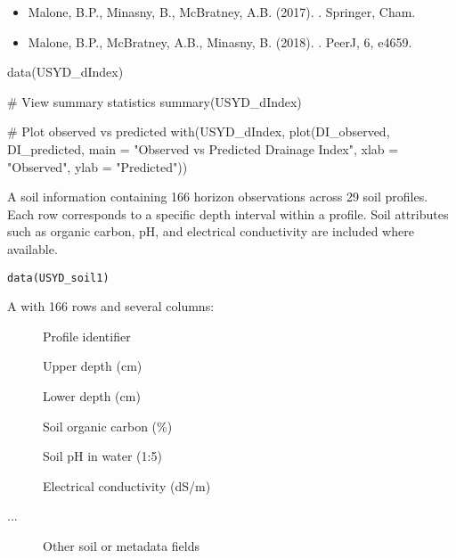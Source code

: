 \documentclass[a4paper]{book}
\begin{document}
%
\begin{References}
\begin{itemize}

\item{} Malone, B.P., Minasny, B., McBratney, A.B. (2017). . Springer, Cham.
\item{} Malone, B.P., McBratney, A.B., Minasny, B. (2018). . PeerJ, 6, e4659.

\end{itemize}

\end{References}
%
\begin{Examples}
\begin{ExampleCode}
data(USYD_dIndex)

# View summary statistics
summary(USYD_dIndex)

# Plot observed vs predicted
with(USYD_dIndex, plot(DI_observed, DI_predicted,
     main = "Observed vs Predicted Drainage Index",
     xlab = "Observed", ylab = "Predicted"))
\end{ExampleCode}
\end{Examples}
%
\begin{Description}
A soil information  containing 166 horizon observations across 29 soil profiles. Each row corresponds to a specific depth interval within a profile. Soil attributes such as organic carbon, pH, and electrical conductivity are included where available.
\end{Description}
%
\begin{Usage}
\begin{verbatim}
data(USYD_soil1)
\end{verbatim}
\end{Usage}
%
\begin{Format}
A  with 166 rows and several columns:
\begin{description}

\item[] Profile identifier
\item[] Upper depth (cm)
\item[] Lower depth (cm)
\item[] Soil organic carbon (\%)
\item[] Soil pH in water (1:5)
\item[] Electrical conductivity (dS/m)
\item[...] Other soil or metadata fields

\end{description}

\end{Format}
\end{document}
